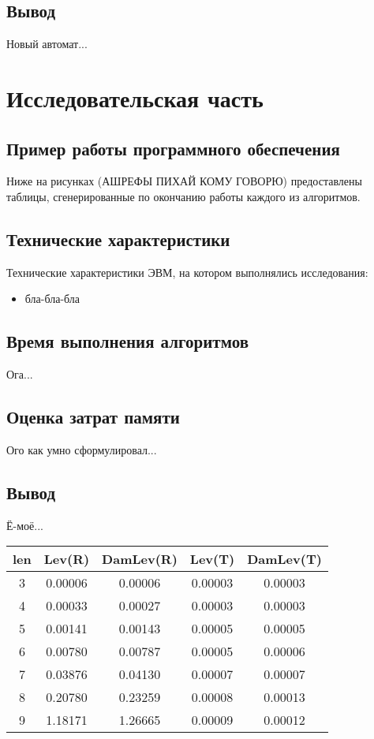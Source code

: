 \documentclass[12pt]{report}
\begin{document}
\section{Вывод}
Новый автомат...

\chapter{Исследовательская часть}

\section{Пример работы программного обеспечения}
Ниже на рисунках (АШРЕФЫ ПИХАЙ КОМУ ГОВОРЮ) предоставлены таблицы, сгенерированные по окончанию работы каждого из алгоритмов.

\section{Технические характеристики}
Технические характеристики ЭВМ, на котором выполнялись исследования:
\begin{itemize}
\item бла-бла-бла
\end{itemize}

\section{Время выполнения алгоритмов}
Ога...

\section{Оценка затрат памяти}
Ого как умно сформулировал...

\section{Вывод}
Ё-моё...

\begin{center}
	\begin{tabular}{|c c c c c|} 
 	\hline
	len & Lev(R) & DamLev(R) & Lev(T) & DamLev(T) \\ [0.5ex] 
 	\hline\hline
 	3 & 0.00006 & 0.00006 & 0.00003 & 0.00003\\
 	\hline
 	4 & 0.00033 & 0.00027 & 0.00003 & 0.00003\\
 	\hline
	5 & 0.00141 & 0.00143 & 0.00005 & 0.00005\\
	\hline
	6 & 0.00780 & 0.00787 & 0.00005 & 0.00006\\
	\hline
	7 & 0.03876 & 0.04130 & 0.00007 & 0.00007\\
	\hline
	8 & 0.20780 & 0.23259 & 0.00008 & 0.00013\\
	\hline
	9 & 1.18171 & 1.26665 & 0.00009 & 0.00012\\
	\hline
	\end{tabular}
\end{center}
\end{document}
